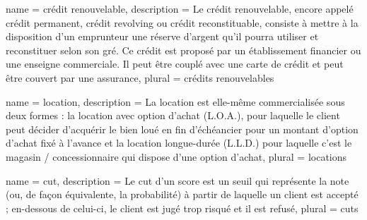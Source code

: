 {
	name = crédit renouvelable,
	description = {Le crédit renouvelable, encore appelé crédit permanent, crédit revolving ou crédit reconstituable, consiste à mettre à la disposition d'un emprunteur une réserve d'argent qu'il pourra utiliser et reconstituer selon son gré. Ce crédit est proposé par un établissement financier ou une enseigne commerciale. Il peut être couplé avec une carte de crédit et peut être couvert par une assurance},
	plural = crédits renouvelables
}

{
	name = location,
	description = {La location est elle-même commercialisée sous deux formes : la location avec option d'achat (L.O.A.), pour laquelle le client peut décider d'acquérir le bien loué en fin d'échéancier pour un montant d'option d'achat fixé à l'avance et la location longue-durée (L.L.D.) pour laquelle c'est le magasin / concessionnaire qui dispose d'une option d'achat},
	plural = locations
}

{
	name = cut,
	description = {Le cut d'un score est un seuil qui représente la note (ou, de façon équivalente, la probabilité) à partir de laquelle un client est accepté ; en-dessous de celui-ci, le client est jugé trop risqué et il est refusé},
	plural = cuts
}









